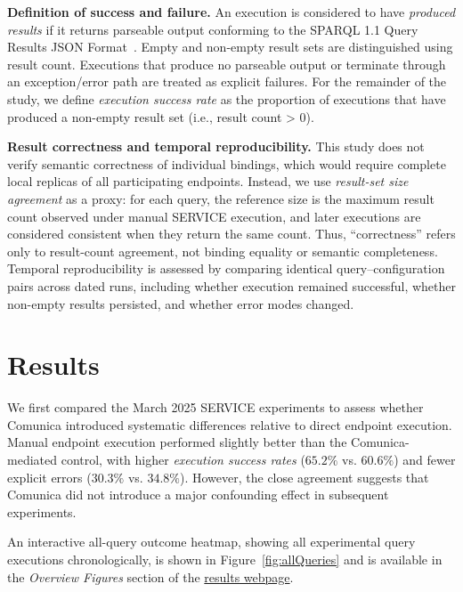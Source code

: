 \documentclass[runningheads]{llncs}
\begin{document}
\textbf{Definition of success and failure.}
An execution is considered to have \emph{produced results} if it returns parseable output conforming to the SPARQL 1.1 Query Results JSON Format~\cite{sparql11resultsjson}. 
Empty and non-empty result sets are distinguished using result count. 
Executions that produce no parseable output or terminate through an exception/error path are treated as explicit failures.
For the remainder of the study, we define \emph{execution success rate} as the proportion of executions that have produced a non-empty result set (i.e., result count > 0). 

\textbf{Result correctness and temporal reproducibility.}
This study does not verify semantic correctness of individual bindings, which would require complete local replicas of all participating endpoints. 
Instead, we use \textit{result-set size agreement} as a proxy: for each query, the reference size is the maximum result count observed under manual \textsc{SERVICE} execution, and later executions are considered consistent when they return the same count. 
Thus, ``correctness'' refers only to result-count agreement, not binding equality or semantic completeness. 
Temporal reproducibility is assessed by comparing identical query--configuration pairs across dated runs, including whether execution remained successful, whether non-empty results persisted, and whether error modes changed.


\section{Results}\label{sec5}
We first compared the March 2025 \textsc{SERVICE} experiments to assess whether Comunica introduced systematic differences relative to direct endpoint execution.
Manual endpoint execution performed slightly better than the Comunica-mediated control, with higher \emph{execution success rates} (\(65.2\%\) vs. \(60.6\%\)) and fewer explicit errors (\(30.3\%\) vs. \(34.8\%\)).
However, the close agreement suggests that Comunica did not introduce a major confounding effect in subsequent experiments.

An interactive all-query outcome heatmap, showing all experimental query executions chronologically, is shown in Figure~\ref{fig:allQueries} and is available in the \textit{Overview Figures} section of the \href{https://ecrum19.github.io/fed-survey-results/}{results webpage}.
\end{document}
